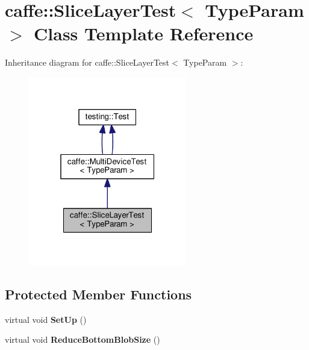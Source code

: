 \hypertarget{classcaffe_1_1_slice_layer_test}{}\section{caffe\+:\+:Slice\+Layer\+Test$<$ Type\+Param $>$ Class Template Reference}
\label{classcaffe_1_1_slice_layer_test}


Inheritance diagram for caffe\+:\+:Slice\+Layer\+Test$<$ Type\+Param $>$\+:
\nopagebreak
\begin{figure}[H]
\begin{center}
\leavevmode
\includegraphics[width=196pt]{classcaffe_1_1_slice_layer_test__inherit__graph}
\end{center}
\end{figure}
\subsection*{Protected Member Functions}
\begin{DoxyCompactItemize}
\item 
\mbox{\label{classcaffe_1_1_slice_layer_test_aee6f1f5e5fdc0237246e42bc5f0ab364}} 
virtual void {\bfseries Set\+Up} ()
\item 
\mbox{\label{classcaffe_1_1_slice_layer_test_ac4df1e63ab07ebced74317b58673d110}} 
virtual void {\bfseries Reduce\+Bottom\+Blob\+Size} ()
\end{DoxyCompactItemize}
